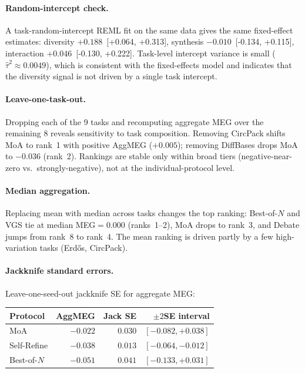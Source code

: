 \documentclass{article}
\begin{document}
\paragraph{Random-intercept check.}
A task-random-intercept REML fit on the same data gives the same fixed-effect estimates: diversity $+0.188$ \,[+0.064, +0.313], synthesis $-0.010$ \,[-0.134, +0.115], interaction $+0.046$ \,[-0.130, +0.222]. Task-level intercept variance is small ($\hat{\tau}^2 \approx 0.0049$), which is consistent with the fixed-effects model and indicates that the diversity signal is not driven by a single task intercept.

\paragraph{Leave-one-task-out.}
Dropping each of the 9 tasks and recomputing aggregate MEG over the remaining 8 reveals sensitivity to task composition. Removing CircPack shifts MoA to rank~1 with positive AggMEG ($+0.005$); removing DiffBases drops MoA to $-0.036$ (rank~2). Rankings are stable only within broad tiers (negative-near-zero vs.\ strongly-negative), not at the individual-protocol level.

\paragraph{Median aggregation.}
Replacing mean with median across tasks changes the top ranking: Best-of-$N$ and VGS tie at median MEG${=}0.000$ (ranks~1--2), MoA drops to rank~3, and Debate jumps from rank~8 to rank~4. The mean ranking is driven partly by a few high-variation tasks (Erd\H{o}s, CircPack).

\paragraph{Jackknife standard errors.}
Leave-one-seed-out jackknife SE for aggregate MEG:

\begin{center}
\small
\begin{tabular}{l r r r}
\toprule
Protocol & AggMEG & Jack SE & $\pm2$SE interval \\
\midrule
MoA         & $-0.022$ & $0.030$ & $[-0.082, +0.038]$ \\
Self-Refine & $-0.038$ & $0.013$ & $[-0.064, -0.012]$ \\
Best-of-$N$ & $-0.051$ & $0.041$ & $[-0.133, +0.031]$ \\
\bottomrule
\end{tabular}
\end{center}
\end{document}
